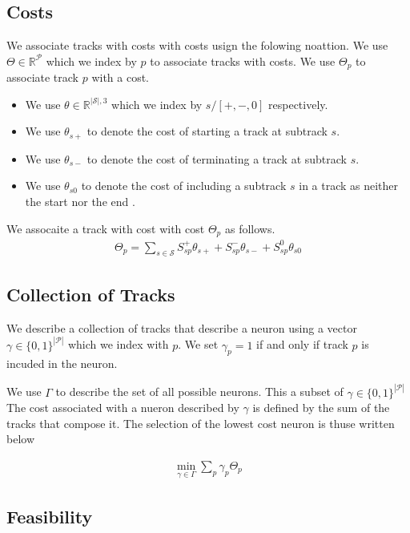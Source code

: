 \documentclass{article}
\begin{document}
\subsection{Costs }
We associate tracks with costs with costs usign the folowing noattion.  We use $\Theta \in \mathbb{R}^{\mathcal{P}}$ which we index by $p$ to associate  tracks  with costs.  We use $\Theta_p$ to associate track $p$ with a cost.  
\begin{itemize}
\item We use $\theta \in \mathbb{R}^{|\mathcal{S}|,3}$ which we index by $s/ [+,-,0]$ respectively.  
\item 
We use $\theta_{s+}$ to denote the cost of starting a track at subtrack $s$.  
\item 
We use $\theta_{s-}$ to denote the cost of terminating a track at subtrack $s$. 
\item 
We use $\theta_{s0}$ to denote the cost of including  a subtrack $s$ in a track as neither the start nor the end  . 
 \end{itemize}
 
 We assocaite a track with cost with cost $\Theta_p$ as follows.  
 \begin{align}
 \Theta_p=\sum_{s \in \mathcal{S}}S^+_{sp}\theta_{s+}+S^-_{sp}\theta_{s-}+S^0_{sp}\theta_{s0}
 \end{align}
 
 \subsection{Collection of Tracks}
 
 We describe a collection of tracks that describe a neuron using a vector $\gamma \in \{ 0,1\}^{|\mathcal{P}|}$ which we index with $p$.  We set $\gamma_p=1$ if and only if track $p$ is incuded in the neuron.  
 
 We use $\Gamma$ to describe the set of all possible neurons.  This a subset of $\gamma \in \{ 0,1\}^{|\mathcal{P}|}$ The cost associated with a nueron described by $\gamma$ is defined by the sum of the tracks that compose it.  The selection of the lowest cost neuron is thuse written below   
 
 \begin{align}
 \min_{\gamma \in \Gamma}\sum_p \gamma_p\Theta_p
 \end{align}
 
 \subsection{Feasibility}
\end{document}

